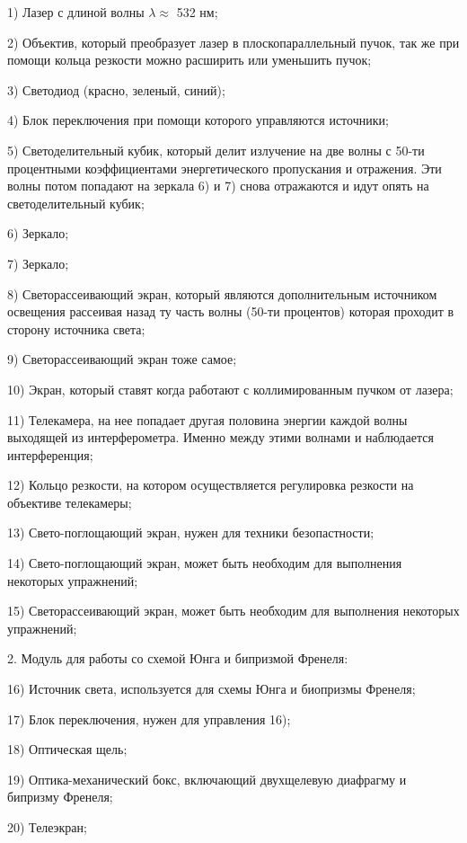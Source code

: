 \documentclass[12pt, a4paper]{report}
\begin{document}
1) Лазер с длиной волны \( \lambda \approx\)   532 нм;

2) Объектив, который преобразует лазер в плоскопараллельный пучок, так же при помощи кольца резкости можно
расширить или уменьшить пучок;

3) Светодиод (красно, зеленый, синий);

4) Блок переключения при помощи которого управляются источники;

5) Светоделительный кубик, который делит излучение на две волны с 50-ти процентными коэффициентами
энергетического пропускания и отражения. Эти волны потом попадают на зеркала 6) и 7) снова отражаются и
идут опять на светоделительный кубик;

6) Зеркало;


7) Зеркало;

8) Светорассеивающий экран, который являются дополнительным источником освещения рассеивая назад ту
часть волны (50-ти процентов) которая проходит в сторону источника света;

9) Светорассеивающий экран тоже самое;

10) Экран, который ставят когда работают с коллимированным пучком от лазера;

11) Телекамера, на нее попадает другая половина энергии каждой волны выходящей из интерферометра. Именно
между этими волнами и наблюдается интерференция;

12) Кольцо резкости, на котором осуществляется регулировка резкости на объективе телекамеры;

13) Свето-поглощающий экран, нужен для техники безопастности;

14) Свето-поглощающий экран, может быть необходим для выполнения некоторых упражнений;

15) Светорассеивающий экран, может быть необходим для выполнения некоторых упражнений;

\begin{flushleft}
    2. Модуль для работы со схемой Юнга и бипризмой Френеля:
\end{flushleft}


16) Источник света, используется для схемы Юнга и биопризмы Френеля;

17) Блок переключения, нужен для управления 16);

18) Оптическая щель;

19) Оптика-механический бокс, включающий двухщелевую диафрагму и бипризму Френеля;

20) Телеэкран;
\end{document}

